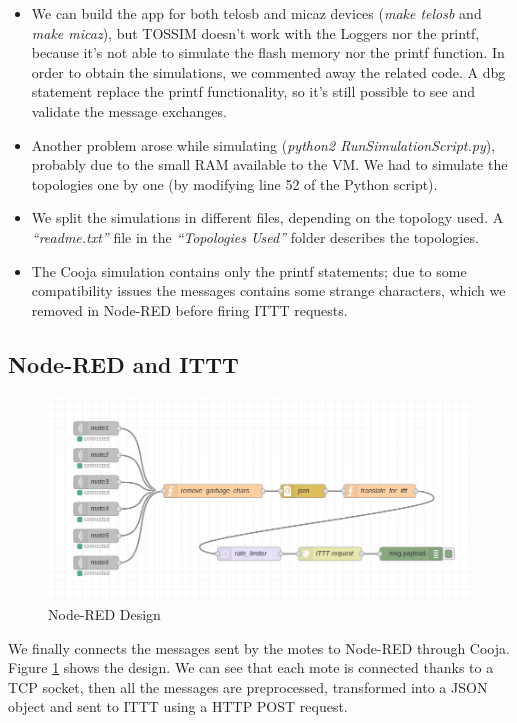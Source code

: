 \documentclass[12pt]{article}
\begin{document}
\begin{itemize}
\item We can build the app for both telosb and micaz devices (\textit{make telosb} and \textit{make micaz}), but TOSSIM doesn't work with the Loggers nor the printf, because it's not able to simulate the flash memory nor the printf function. In order to obtain the simulations, we commented away the related code. A dbg statement replace the printf functionality, so it's still possible to see and validate the message exchanges. 
\item Another problem arose while simulating (\textit{python2 RunSimulationScript.py}), probably due to the small RAM available to the VM. We had to simulate the topologies one by one (by modifying line 52 of the Python script).
\item We split the simulations in different files, depending on the topology used. A \textit{``readme.txt''} file in the \textit{``Topologies Used''} folder describes the topologies.
\item The Cooja simulation contains only the printf statements; due to some compatibility issues the messages contains some strange characters, which we removed in Node-RED before firing ITTT requests. 
\end{itemize}

\subsection{Node-RED and ITTT}
\begin{figure}[h]
	\centering
	\captionsetup{justification=centering}
	\includegraphics[width=\textwidth]{red-node-final.png}	
	\caption{Node-RED Design}
	\label{fig:red-node}
\end{figure}
We finally connects the messages sent by the motes to Node-RED through Cooja. Figure \ref{fig:red-node} shows the design. We can see that each mote is connected thanks to a TCP socket, then all the messages are preprocessed, transformed into a JSON object and sent to ITTT using a HTTP POST request. 
\end{document}
